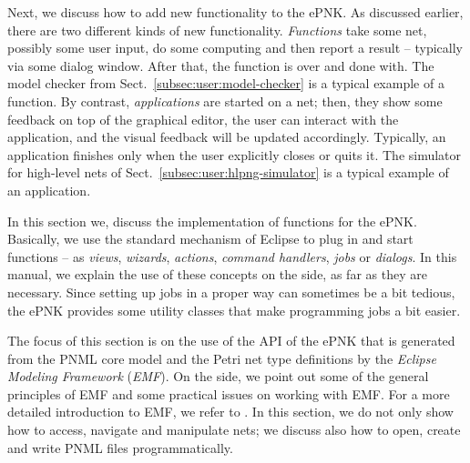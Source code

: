 Next, we discuss how to add new functionality to the ePNK. As discussed
earlier, there are two different kinds of new functionality. \emph{Functions}
take some net, possibly some user input, do some computing and then report
a result -- typically via some dialog window. After that, the function
is over and done with. The model checker from
Sect.~\ref{subsec:user:model-checker} is a typical example of a function.
By contrast, \emph{applications}%
are started on a net; then, they show some feedback on top of the graphical
editor, the user can interact with the application, and the visual feedback
will be updated accordingly. Typically, an application finishes only
when the user explicitly closes or quits it. The simulator for high-level nets
of Sect.~\ref{subsec:user:hlpng-simulator} is a typical example
of an application.

In this section we, discuss the implementation of functions for the
ePNK. Basically, we use the standard mechanism of Eclipse to plug in
and start functions -- as \emph{views},%
\emph{wizards},%
\emph{actions},%
\emph{command handlers},%
\emph{jobs}%
or \emph{dialogs}.%
In this manual, we explain the use of these concepts on the side, as far as they
are necessary. Since setting up jobs in a proper way can sometimes be a bit
tedious, the ePNK provides some utility classes that make programming jobs a
bit easier.

The focus of this section is on the use of the API of the ePNK that is
generated from the PNML core model and the Petri net type definitions
by the \emph{Eclipse Modeling Framework} (\emph{EMF}).%
On the side, we point out some of the general principles of EMF and some
practical issues on working with EMF. For a more detailed introduction
to EMF, we refer to \cite{BSM06}. In this section, we do not only show
how to access, navigate and manipulate nets; we discuss also how
to open, create and write PNML files programmatically.

